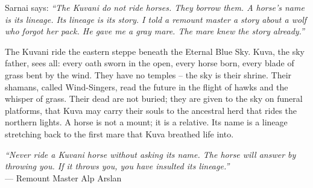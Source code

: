 \documentclass[12pt,oneside]{book}
\begin{document}
\noindent
Sarnai says: \textit{``The Kuvani do not ride horses. They borrow them. A horse's name is its lineage. Its lineage is its story. I told a remount master a story about a wolf who forgot her pack. He gave me a gray mare. The mare knew the story already.''}

\noindent
The Kuvani ride the eastern steppe beneath the Eternal Blue Sky. Kuva, the sky father, sees all: every oath sworn in the open, every horse born, every blade of grass bent by the wind. They have no temples -- the sky is their shrine. Their shamans, called Wind-Singers, read the future in the flight of hawks and the whisper of grass. Their dead are not buried; they are given to the sky on funeral platforms, that Kuva may carry their souls to the ancestral herd that rides the northern lights. A horse is not a mount; it is a relative. Its name is a lineage stretching back to the first mare that Kuva breathed life into.

\vspace{0.5em}
\noindent\textit{``Never ride a Kuvani horse without asking its name. The horse will answer by throwing you. If it throws you, you have insulted its lineage.''} \\
--- Remount Master Alp Arslan
\end{document}
